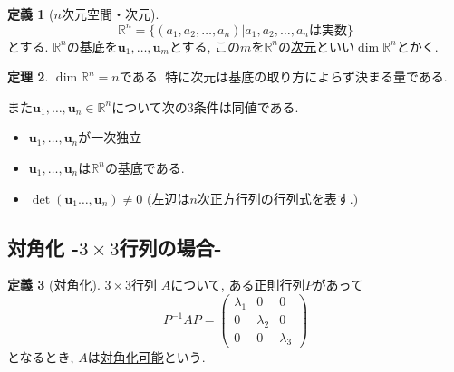\documentclass[dvipdfmx,a4paper,11pt]{article}
\newcommand{\R}{\mathbb{R}}
\theoremstyle{definition}
\newtheorem{thm}{定理}
\newtheorem{dfn}[thm]{定義}
\begin{document}
 \begin{tcolorbox}[
    colback = white,
    colframe = green!35!black,
    fonttitle = \bfseries,
    breakable = true]
    \begin{dfn}[$n$次元空間・次元]
$$
\R^n  = \{ (a_1, a_2, \ldots, a_n) | \text{$a_1, a_2, \ldots, a_n$は実数}\} 
$$
とする. 
$\R^n$の基底を$\bm{u}_1, \ldots, \bm{u}_m$とする, この$m$を$\R^n$の\underline{次元}といい$\dim \R^n$とかく.
    \end{dfn}
 \end{tcolorbox}
 
 
  \begin{tcolorbox}[
    colback = white,
    colframe = green!35!black,
    fonttitle = \bfseries,
    breakable = true]
    \begin{thm}
$\dim \R^n =n$である. 特に次元は基底の取り方によらず決まる量である.

また$\bm{u}_1, \ldots, \bm{u}_n \in \R^n$について次の3条件は同値である.
 \begin{itemize}
 \setlength{\parskip}{0cm}
  	\setlength{\itemsep}{0pt} 
 \item $\bm{u}_1, \ldots, \bm{u}_n$が一次独立
  \item $\bm{u}_1, \ldots, \bm{u}_n$は$\R^n$の基底である. 
\item  $\det 
(\bm{u}_1 \ldots,\bm{u}_n)
  \neq 0$ (左辺は$n$次正方行列の行列式を表す.)
  \end{itemize}
    \end{thm}
 \end{tcolorbox}
 

\subsection{対角化 -$3 \times 3$行列の場合-}

  \begin{tcolorbox}[
    colback = white,
    colframe = green!35!black,
    fonttitle = \bfseries,
    breakable = true]
    \begin{dfn}[対角化]
    
$3 \times 3$行列
$A$について, ある正則行列$P$があって
$$
P^{-1} A P=
\begin{pmatrix}
\lambda_1& 0 &0\\
0& \lambda_2 &0\\
0 & 0& \lambda_3
\end{pmatrix}
$$
となるとき, $A$は\underline{対角化可能}という.
  \end{dfn}
 \end{tcolorbox}
\end{document}
